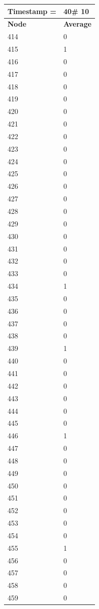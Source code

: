 \begin{tabular}{|l||l|}
\hline
\textbf{Timestamp =} & \textbf{40}\# 10\\\hline
	\textbf{Node} & \textbf{Average} \\ \hline
\hline
	414 & 0 \\ \hline
	415 & 1 \\ \hline
	416 & 0 \\ \hline
	417 & 0 \\ \hline
	418 & 0 \\ \hline
	419 & 0 \\ \hline
	420 & 0 \\ \hline
	421 & 0 \\ \hline
	422 & 0 \\ \hline
	423 & 0 \\ \hline
	424 & 0 \\ \hline
	425 & 0 \\ \hline
	426 & 0 \\ \hline
	427 & 0 \\ \hline
	428 & 0 \\ \hline
	429 & 0 \\ \hline
	430 & 0 \\ \hline
	431 & 0 \\ \hline
	432 & 0 \\ \hline
	433 & 0 \\ \hline
	434 & 1 \\ \hline
	435 & 0 \\ \hline
	436 & 0 \\ \hline
	437 & 0 \\ \hline
	438 & 0 \\ \hline
	439 & 1 \\ \hline
	440 & 0 \\ \hline
	441 & 0 \\ \hline
	442 & 0 \\ \hline
	443 & 0 \\ \hline
	444 & 0 \\ \hline
	445 & 0 \\ \hline
	446 & 1 \\ \hline
	447 & 0 \\ \hline
	448 & 0 \\ \hline
	449 & 0 \\ \hline
	450 & 0 \\ \hline
	451 & 0 \\ \hline
	452 & 0 \\ \hline
	453 & 0 \\ \hline
	454 & 0 \\ \hline
	455 & 1 \\ \hline
	456 & 0 \\ \hline
	457 & 0 \\ \hline
	458 & 0 \\ \hline
	459 & 0 \\ \hline
\end{tabular}
